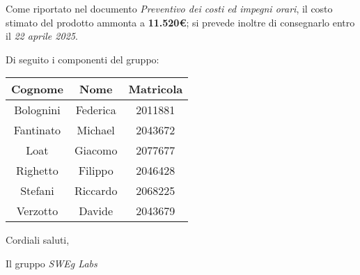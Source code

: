 Come riportato nel documento \emph{Preventivo dei costi ed impegni orari}, il costo stimato del prodotto ammonta a \textbf{11.520€};
si prevede inoltre di consegnarlo entro il \emph{22 aprile 2025}.

\vspace{0.5cm}

Di seguito i componenti del gruppo:

\begin{table}[h]
    \centering
    \begin{tabular}{|c|c|c|}
        \hline
        \rowcolor[gray]{0.9}
        \textbf{Cognome} & \textbf{Nome} & \textbf{Matricola}\\
        \hline
        Bolognini & Federica & 2011881 \\
        \hline
        Fantinato & Michael & 2043672 \\
        \hline
        Loat & Giacomo & 2077677 \\
        \hline
        Righetto & Filippo & 2046428 \\
        \hline
        Stefani & Riccardo & 2068225 \\
        \hline
        Verzotto & Davide & 2043679 \\
        \hline
    \end{tabular}
\end{table}

\vspace{0.5cm}

Cordiali saluti,
\begin{flushright}
    Il gruppo \emph{SWEg Labs}
\end{flushright}
